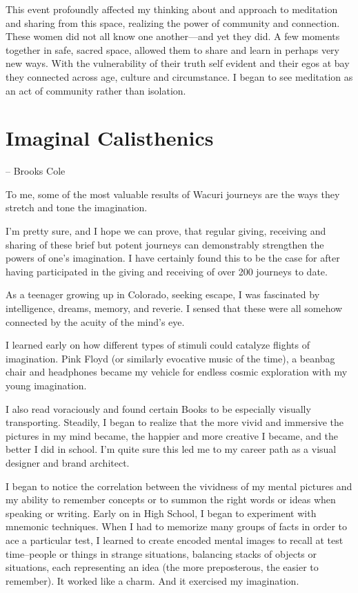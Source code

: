 \documentclass[12pt]{book}
\begin{document}
This event profoundly affected my thinking about and approach to
meditation and sharing from this space, realizing the power of
community and connection. These women did not all know one another---and
yet they did. A few moments together in safe, sacred space, allowed
them to share and learn in perhaps very new ways.  With the
vulnerability of their truth self evident and their egos at bay they
connected across age, culture and circumstance. I began to see
meditation as an act of community rather than isolation.

\section{Imaginal Calisthenics}
-- Brooks Cole

To me, some of the most valuable results of Wacuri journeys are the
ways they stretch and tone the imagination.

I'm pretty sure, and I hope we can prove, that regular giving,
receiving and sharing of these brief but potent journeys can
demonstrably strengthen the powers of one’s imagination. I have
certainly found this to be the case for after having participated in
the giving and receiving of over 200 journeys to date.

As a teenager growing up in Colorado, seeking escape, I was fascinated
by intelligence, dreams, memory, and reverie. I sensed that these were
all somehow connected by the acuity of the mind’s eye.

I learned early on how different types of stimuli could catalyze
flights of imagination. Pink Floyd (or similarly evocative music of
the time), a beanbag chair and headphones became my vehicle for
endless cosmic exploration with my young imagination.

I also read voraciously and found certain Books to be especially
visually transporting. Steadily, I began to realize that the more
vivid and immersive the pictures in my mind became, the happier and
more creative I became, and the better I did in school. I'm quite sure
this led me to my career path as a visual designer and brand
architect.

I began to notice the correlation between the vividness of my mental
pictures and my ability to remember concepts or to summon the right
words or ideas when speaking or writing. Early on in High School, I
began to experiment with mnemonic techniques. When I had to memorize
many groups of facts in order to ace a particular test, I learned to
create encoded mental images to recall at test time--people or things
in strange situations, balancing stacks of objects or situations, each
representing an idea (the more preposterous, the easier to
remember). It worked like a charm. And it exercised my imagination.
\end{document}
